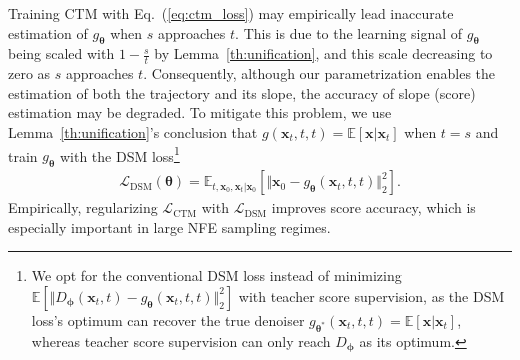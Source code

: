 \documentclass{article} \usepackage{iclr2024_coNFErence,times}
\def\eqref#1{equation~\ref{#1}}
\def\eqref#1{(\ref{#1})}
\def\eqref#1{(\ref{#1})}
\theoremstyle{definition}
\theoremstyle{remark}
\begin{document}
Training CTM with Eq.~\eqref{eq:ctm_loss} may empirically lead inaccurate estimation of $g_{\bm{\theta}}$ when $s$ approaches $t$. This is due to the learning signal of $g_{\bm{\theta}}$ being scaled with $1-\frac{s}{t}$ by Lemma~\ref{th:unification}, and this scale decreasing to zero as $s$ approaches $t$. Consequently, although our parametrization enables the estimation of both the trajectory and its slope, the accuracy of slope (score) estimation may be degraded. To mitigate this problem, we use Lemma~\ref{th:unification}'s conclusion that
$g(\mathbf{x}_{t},t,t)=\mathbb{E}[\mathbf{x}\vert\mathbf{x}_{t}]$ when $t=s$ and train $g_{\bm{\theta}}$ with the DSM loss\footnote{We opt for the conventional DSM loss instead of minimizing $\mathbb{E}[\Vert D_{\bm{\phi}}(\mathbf{x}_{t},t)-g_{\bm{\theta}}(\mathbf{x}_{t},t,t)\Vert_{2}^{2}]$  with teacher score supervision, as the DSM loss's optimum can recover the true denoiser $g_{\bm{\theta}^{*}}(\mathbf{x}_{t},t,t)=\mathbb{E}[\mathbf{x}\vert\mathbf{x}_{t}]$, whereas teacher score supervision can only reach $D_{\bm{\phi}}$ as its optimum.}
\begin{align*}\mathcal{L}_{\text{DSM}}(\bm{\theta})=\mathbb{E}_{t,\mathbf{x}_{0},\mathbf{x}_{t}\vert\mathbf{x}_{0}}[\Vert \mathbf{x}_{0}-g_{\bm{\theta}}(\mathbf{x}_{t},t,t) \Vert_{2}^{2}].
\end{align*}
Empirically, regularizing $\mathcal{L}_{\text{CTM}}$ with $\mathcal{L}_{\text{DSM}}$ improves score accuracy, which is especially important in large NFE sampling regimes.
\end{document}
